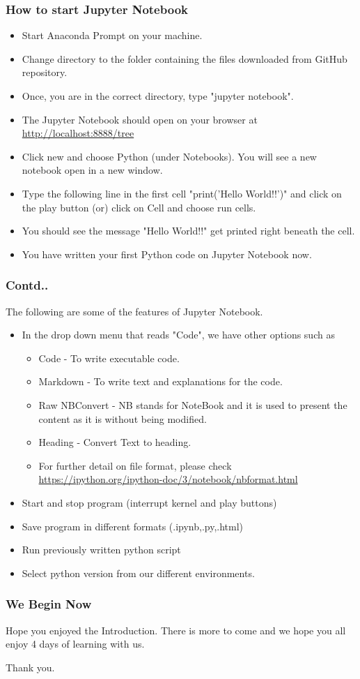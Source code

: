 \documentclass{beamer}
\begin{document}
\begin{frame}
\frametitle{How to start Jupyter Notebook}
\begin{itemize}
\item Start Anaconda Prompt on your machine.
\item Change directory to the folder containing the files downloaded from GitHub repository.
\item Once, you are in the correct directory, type  "jupyter notebook".
\item The Jupyter Notebook should open on your browser at \url{http://localhost:8888/tree}
\item Click new and choose Python (under Notebooks). You will see a new notebook open in a new window.
\item Type the following line in the first cell "print('Hello World!!')" and click on the play button (or) click on Cell and choose run cells.
\item You should see the message "Hello World!!" get printed right beneath the cell.
\item You have written your first Python code on Jupyter Notebook now.
\end{itemize}
\end{frame}

\begin{frame}
\frametitle{Contd..}
The following are some of the features of Jupyter Notebook.
\begin{itemize}
\item In the drop down menu that reads "Code", we have other options such as 
\begin{itemize}
\item Code - To write executable code.
\item Markdown - To write text and explanations for the code.
\item Raw NBConvert - NB stands for NoteBook and it is used to present the content as it is without being modified.
\item Heading -  Convert Text to heading.
\item For further detail on file format, please check \url{https://ipython.org/ipython-doc/3/notebook/nbformat.html}
 
\end{itemize}
\item Start and stop program (interrupt kernel and play buttons)
\item Save program in different formats (.ipynb,.py,.html)
\item Run previously written python script
\item Select python version from our different environments.
\end{itemize}
\end{frame}
\begin{frame}
\frametitle{We Begin Now}
\centering
Hope you enjoyed the Introduction. There is more to come and we hope you all enjoy 4 days of learning with us.


Thank you. 
\end{frame}
\end{document}
